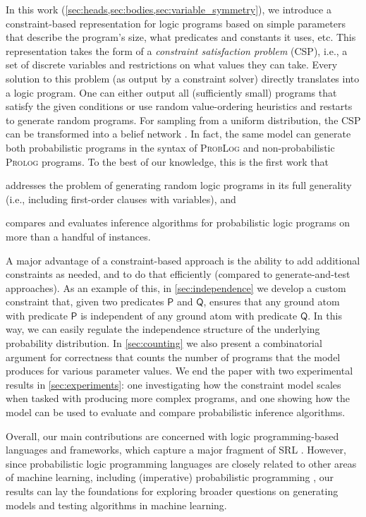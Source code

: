 \documentclass[runningheads]{llncs}
\begin{document}
In this work (\cref{sec:heads,sec:bodies,sec:variable_symmetry}), we introduce a
constraint-based representation for logic programs based on simple parameters
that describe the program's size, what predicates and constants it uses, etc.
This representation takes the form of a \emph{constraint satisfaction problem}
(CSP), i.e., a set of discrete variables and restrictions on what values they
can take. Every solution to this problem (as output by a constraint solver)
directly translates into a logic program. One can either output all
(sufficiently small) programs that satisfy the given conditions or use random
value-ordering heuristics and restarts to generate random programs. For sampling
from a uniform distribution, the CSP can be transformed into a belief network
\cite{DBLP:conf/aaai/DechterKBE02}. In fact, the same model can generate both
probabilistic programs in the syntax of \textsc{ProbLog}
\cite{DBLP:conf/ijcai/RaedtKT07} and non-probabilistic \textsc{Prolog} programs.
To the best of our knowledge, this is the first work that
\begin{enumerate*}[(a)]
\item addresses the problem of generating random logic programs in its full
  generality (i.e., including first-order clauses with variables), and
\item compares and evaluates inference algorithms for probabilistic logic
  programs on more than a handful of instances.
\end{enumerate*}

A major advantage of a constraint-based approach is the ability to add
additional constraints as needed, and to do that efficiently (compared to
generate-and-test approaches). As an example of this, in \cref{sec:independence}
we develop a custom constraint that, given two predicates $\mathsf{P}$ and
$\mathsf{Q}$, ensures that any ground atom with predicate $\mathsf{P}$ is
independent of any ground atom with predicate $\mathsf{Q}$. In this way, we can
easily regulate the independence structure of the underlying probability
distribution. In \cref{sec:counting} we also present a combinatorial argument
for correctness that counts the number of programs that the model produces for
various parameter values. We end the paper with two experimental results in
\cref{sec:experiments}: one investigating how the constraint model scales when
tasked with producing more complex programs, and one showing how the model can
be used to evaluate and compare probabilistic inference algorithms.

Overall, our main contributions are concerned with logic programming-based
languages and frameworks, which capture a major fragment of SRL
\cite{DBLP:series/synthesis/2016Raedt}. However, since probabilistic logic
programming languages are closely related to other areas of machine learning,
including (imperative) probabilistic programming
\cite{DBLP:journals/ml/RaedtK15}, our results can lay the foundations for
exploring broader questions on generating models and testing algorithms in
machine learning.
\end{document}
